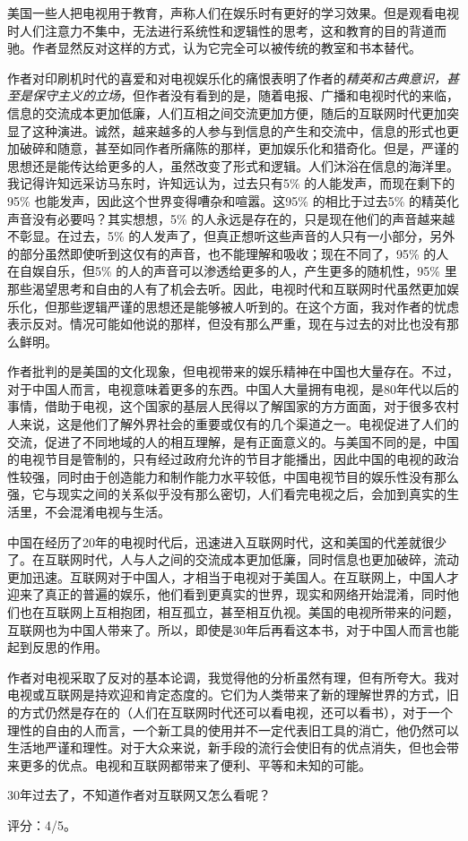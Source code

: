美国一些人把电视用于教育，声称人们在娱乐时有更好的学习效果。但是观看电视时人们注意力不集中，无法进行系统性和逻辑性的思考，这和教育的目的背道而驰。作者显然反对这样的方式，认为它完全可以被传统的教室和书本替代。

作者对印刷机时代的喜爱和对电视娱乐化的痛恨表明了作者的\emph{精英和古典意识，甚至是保守主义的立场}，但作者没有看到的是，随着电报、广播和电视时代的来临，信息的交流成本更加低廉，人们互相之间交流更加方便，随后的互联网时代更加突显了这种演进。诚然，越来越多的人参与到信息的产生和交流中，信息的形式也更加破碎和随意，甚至如同作者所痛陈的那样，更加娱乐化和猎奇化。但是，严谨的思想还是能传达给更多的人，虽然改变了形式和逻辑。人们沐浴在信息的海洋里。我记得许知远采访马东时，许知远认为，过去只有5\% 的人能发声，而现在剩下的95\% 也能发声，因此这个世界变得嘈杂和喧嚣。这95\% 的相比于过去5\% 的精英化声音没有必要吗？其实想想，5\% 的人永远是存在的，只是现在他们的声音越来越不彰显。在过去，5\% 的人发声了，但真正想听这些声音的人只有一小部分，另外的部分虽然即使听到这仅有的声音，也不能理解和吸收；现在不同了，95\% 的人在自娱自乐，但5\% 的人的声音可以渗透给更多的人，产生更多的随机性，95\% 里那些渴望思考和自由的人有了机会去听。因此，电视时代和互联网时代虽然更加娱乐化，但那些逻辑严谨的思想还是能够被人听到的。在这个方面，我对作者的忧虑表示反对。情况可能如他说的那样，但没有那么严重，现在与过去的对比也没有那么鲜明。

作者批判的是美国的文化现象，但电视带来的娱乐精神在中国也大量存在。不过，对于中国人而言，电视意味着更多的东西。中国人大量拥有电视，是80年代以后的事情，借助于电视，这个国家的基层人民得以了解国家的方方面面，对于很多农村人来说，这是他们了解外界社会的重要或仅有的几个渠道之一。电视促进了人们的交流，促进了不同地域的人的相互理解，是有正面意义的。与美国不同的是，中国的电视节目是管制的，只有经过政府允许的节目才能播出，因此中国的电视的政治性较强，同时由于创造能力和制作能力水平较低，中国电视节目的娱乐性没有那么强，它与现实之间的关系似乎没有那么密切，人们看完电视之后，会加到真实的生活里，不会混淆电视与生活。

中国在经历了20年的电视时代后，迅速进入互联网时代，这和美国的代差就很少了。在互联网时代，人与人之间的交流成本更加低廉，同时信息也更加破碎，流动更加迅速。互联网对于中国人，才相当于电视对于美国人。在互联网上，中国人才迎来了真正的普遍的娱乐，他们看到更真实的世界，现实和网络开始混淆，同时他们也在互联网上互相抱团，相互孤立，甚至相互仇视。美国的电视所带来的问题，互联网也为中国人带来了。所以，即使是30年后再看这本书，对于中国人而言也能起到反思的作用。

作者对电视采取了反对的基本论调，我觉得他的分析虽然有理，但有所夸大。我对电视或互联网是持欢迎和肯定态度的。它们为人类带来了新的理解世界的方式，旧的方式仍然是存在的（人们在互联网时代还可以看电视，还可以看书），对于一个理性的自由的人而言，一个新工具的使用并不一定代表旧工具的消亡，他仍然可以生活地严谨和理性。对于大众来说，新手段的流行会使旧有的优点消失，但也会带来更多的优点。电视和互联网都带来了便利、平等和未知的可能。

30年过去了，不知道作者对互联网又怎么看呢？

评分：4/5。